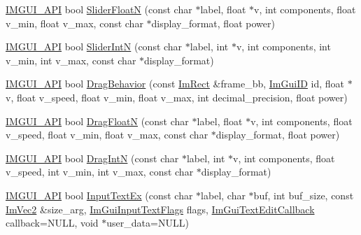 \begin{DoxyCompactItemize}
\item 
\mbox{\hyperlink{imgui_8h_a43829975e84e45d1149597467a14bbf5}{I\+M\+G\+U\+I\+\_\+\+A\+PI}} bool \mbox{\hyperlink{namespace_im_gui_a3ffffbdfe59f18a2321dd1cb39dfb6e1}{Slider\+FloatN}} (const char $\ast$label, float $\ast$v, int components, float v\+\_\+min, float v\+\_\+max, const char $\ast$display\+\_\+format, float power)
\item 
\mbox{\hyperlink{imgui_8h_a43829975e84e45d1149597467a14bbf5}{I\+M\+G\+U\+I\+\_\+\+A\+PI}} bool \mbox{\hyperlink{namespace_im_gui_a13fe35db80c7d1002c98fd5e8ea90239}{Slider\+IntN}} (const char $\ast$label, int $\ast$v, int components, int v\+\_\+min, int v\+\_\+max, const char $\ast$display\+\_\+format)
\item 
\mbox{\hyperlink{imgui_8h_a43829975e84e45d1149597467a14bbf5}{I\+M\+G\+U\+I\+\_\+\+A\+PI}} bool \mbox{\hyperlink{namespace_im_gui_a4fdcba60dbe3762a144051add234ea48}{Drag\+Behavior}} (const \mbox{\hyperlink{struct_im_rect}{Im\+Rect}} \&frame\+\_\+bb, \mbox{\hyperlink{imgui_8h_a1785c9b6f4e16406764a85f32582236f}{Im\+Gui\+ID}} id, float $\ast$v, float v\+\_\+speed, float v\+\_\+min, float v\+\_\+max, int decimal\+\_\+precision, float power)
\item 
\mbox{\hyperlink{imgui_8h_a43829975e84e45d1149597467a14bbf5}{I\+M\+G\+U\+I\+\_\+\+A\+PI}} bool \mbox{\hyperlink{namespace_im_gui_a2a2764b6f0b3291ad0df4d99127dd751}{Drag\+FloatN}} (const char $\ast$label, float $\ast$v, int components, float v\+\_\+speed, float v\+\_\+min, float v\+\_\+max, const char $\ast$display\+\_\+format, float power)
\item 
\mbox{\hyperlink{imgui_8h_a43829975e84e45d1149597467a14bbf5}{I\+M\+G\+U\+I\+\_\+\+A\+PI}} bool \mbox{\hyperlink{namespace_im_gui_a2854d672b818938e6e9fb1de6de3dbe7}{Drag\+IntN}} (const char $\ast$label, int $\ast$v, int components, float v\+\_\+speed, int v\+\_\+min, int v\+\_\+max, const char $\ast$display\+\_\+format)
\item 
\mbox{\hyperlink{imgui_8h_a43829975e84e45d1149597467a14bbf5}{I\+M\+G\+U\+I\+\_\+\+A\+PI}} bool \mbox{\hyperlink{namespace_im_gui_a4a62260abe773d4e193db94cdfdc41bf}{Input\+Text\+Ex}} (const char $\ast$label, char $\ast$buf, int buf\+\_\+size, const \mbox{\hyperlink{struct_im_vec2}{Im\+Vec2}} \&size\+\_\+arg, \mbox{\hyperlink{imgui_8h_a7d2c6153a6b9b5d3178ce82434ac9fb8}{Im\+Gui\+Input\+Text\+Flags}} flags, \mbox{\hyperlink{imgui_8h_ae9254e6ad76a9bc7abc20929e07b29c5}{Im\+Gui\+Text\+Edit\+Callback}} callback=N\+U\+LL, void $\ast$user\+\_\+data=N\+U\+LL)
\item 

\end{DoxyCompactItemize}
